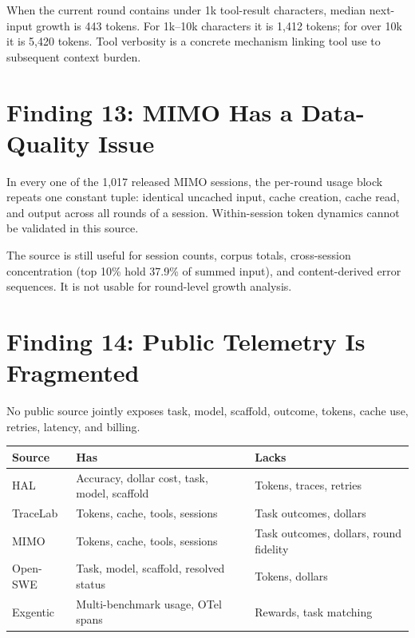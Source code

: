 \documentclass[11pt]{article}
\begin{document}
When the current round contains under 1k tool-result characters, median
next-input growth is 443 tokens. For 1k--10k characters it is 1{,}412 tokens;
for over 10k it is 5{,}420 tokens. Tool verbosity is a concrete mechanism
linking tool use to subsequent context burden.

\section{Finding 13: MIMO Has a Data-Quality Issue}

In every one of the 1{,}017 released MIMO sessions, the per-round usage block
repeats one constant tuple: identical uncached input, cache creation, cache
read, and output across all rounds of a session. Within-session token dynamics
cannot be validated in this source.

The source is still useful for session counts, corpus totals, cross-session
concentration (top 10\% hold 37.9\% of summed input), and content-derived
error sequences. It is not usable for round-level growth analysis.

\section{Finding 14: Public Telemetry Is Fragmented}

No public source jointly exposes task, model, scaffold, outcome, tokens, cache
use, retries, latency, and billing.

\begin{center}
\begin{tabular}{p{2cm}p{5cm}p{5cm}}
\toprule
Source & Has & Lacks \\
\midrule
HAL & Accuracy, dollar cost, task, model, scaffold & Tokens, traces, retries \\
TraceLab & Tokens, cache, tools, sessions & Task outcomes, dollars \\
MIMO & Tokens, cache, tools, sessions & Task outcomes, dollars, round fidelity \\
Open-SWE & Task, model, scaffold, resolved status & Tokens, dollars \\
Exgentic & Multi-benchmark usage, OTel spans & Rewards, task matching \\
\bottomrule
\end{tabular}
\end{center}
\end{document}
